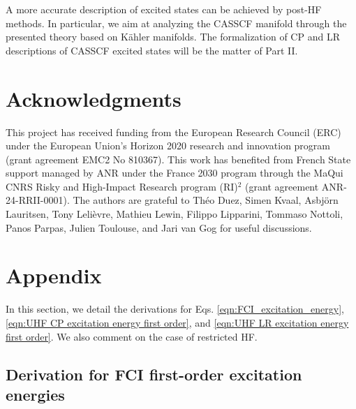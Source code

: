 \documentclass[11pt]{article}
\begin{document}
A more accurate description of excited states can be achieved by post-HF methods. In particular, we aim at analyzing the CASSCF manifold through the presented theory based on Kähler manifolds. The formalization of CP and LR descriptions of CASSCF excited states will be the matter of Part II.

\section*{Acknowledgments}

This project has received funding from the European Research Council (ERC) under the European Union’s Horizon 2020 research and innovation program (grant agreement EMC2 No 810367). This work has benefited from French State support managed by ANR under the France 2030 program through the MaQui CNRS Risky and High-Impact Research program (RI)$^2$ (grant agreement ANR-24-RRII-0001). The authors are grateful to Th\'eo Duez, Simen Kvaal, Asbj\"orn Lauritsen, Tony Leli\`evre, Mathieu Lewin, Filippo Lipparini, Tommaso Nottoli, Panos Parpas, Julien Toulouse, and Jari van Gog for useful discussions.


\normalem

\printbibliography[heading=bibintoc,title={References}]
%
%

\appendix 

\section{Appendix}

\par In this section, we detail the derivations for Eqs. \eqref{eqn:FCI_excitation_energy}, \eqref{eqn:UHF CP excitation energy first order}, and \eqref{eqn:UHF LR excitation energy first order}. We also comment on the case of restricted HF. 

\subsection{Derivation for FCI first-order excitation energies}\label{subsec:FCI_derivation}
\end{document}
